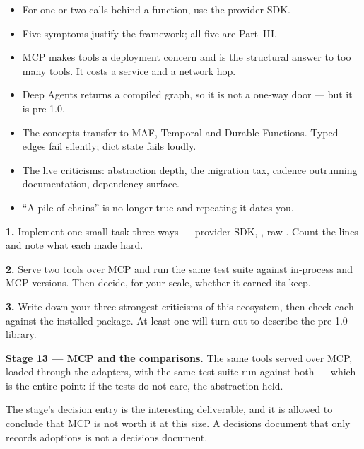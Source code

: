 \begin{itemize}[leftmargin=1.4em]
\item For one or two calls behind a function, use the provider SDK.
\item Five symptoms justify the framework; all five are Part~III.
\item MCP makes tools a deployment concern and is the structural answer to too
      many tools. It costs a service and a network hop.
\item Deep Agents returns a compiled graph, so it is not a one-way door --- but
      it is pre-1.0.
\item The concepts transfer to MAF, Temporal and Durable Functions. Typed edges
      fail silently; dict state fails loudly.
\item The live criticisms: abstraction depth, the migration tax, cadence
      outrunning documentation, dependency surface.
\item ``A pile of chains'' is no longer true and repeating it dates you.
\end{itemize}

\begin{exercisebox}
\textbf{1.} Implement one small task three ways --- provider SDK, ,
raw . Count the lines and note what each made hard.

\textbf{2.} Serve two tools over MCP and run the same test suite against
in-process and MCP versions. Then decide, for your scale, whether it earned its
keep.

\textbf{3.} Write down your three strongest criticisms of this ecosystem, then
check each against the installed package. At least one will turn out to describe
the pre-1.0 library.
\end{exercisebox}

\begin{projectbox}
\textbf{Stage 13 --- MCP and the comparisons.} The same tools served over MCP,
loaded through the adapters, with the same test suite run against both --- which
is the entire point: if the tests do not care, the abstraction held.

The stage's decision entry is the interesting deliverable, and it is allowed to
conclude that MCP is not worth it at this size. A decisions document that only
records adoptions is not a decisions document.
\end{projectbox}
